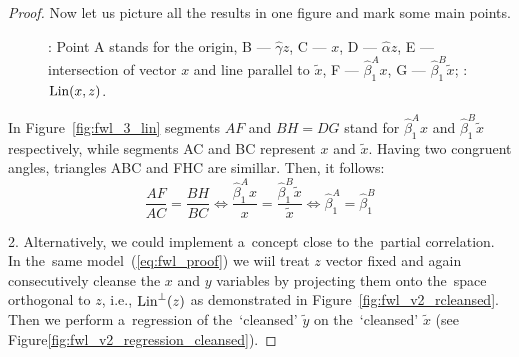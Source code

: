 \begin{proof}
Now let us picture all the results in one figure and mark some main points.

\begin{figure}[ht!]
\begin{center}
\hspace{4ex}
\caption{: Point A stands for the origin, B — $\hat\gamma z$,
C — $x$, D — $\hat\alpha z$, E — intersection of vector $x$ and line parallel to $\tilde x$,
F — $\hat\beta_1^{A} x$, G — $\hat\beta_1^{B} \tilde{x}$; : $\operatorname{Lin}(x,z)$.}
\end{center}
\end{figure}

In Figure~\ref{fig:fwl_3_lin} segments $AF$ and $BH = DG$ stand for $\hat\beta_1^{A}x$
and $\hat\beta_1^{B}\tilde x$ respectively, while segments AC and BC represent $x$ and $\tilde{x}$.
Having two congruent angles, triangles ABC and FHC are simillar.
Then, it follows:
\[
\frac{AF}{AC} = \frac{BH}{BC} \Leftrightarrow \frac{\hat\beta_1^{A}x}{x} = \frac{\hat\beta_1^{B}\tilde x}{\tilde x} \Leftrightarrow \hat\beta_1^{A} = \hat\beta_1^{B}
\]

2. Alternatively, we could implement a~concept close to the~partial correlation.
In the~same model~(\ref{eq:fwl_proof}) we wiil treat $z$ vector fixed and again
consecutively cleanse the $x$ and $y$ variables by projecting them onto
the~space orthogonal to $z$, i.e., $\operatorname{Lin}^\perp(z)$ as demonstrated in Figure~\ref{fig:fwl_v2_rcleansed}.
Then we perform a~regression of the~`cleansed' $\tilde y$ on the~`cleansed' $\tilde x$
(see Figure\ref{fig:fwl_v2_regression_cleansed}).


\end{proof}
